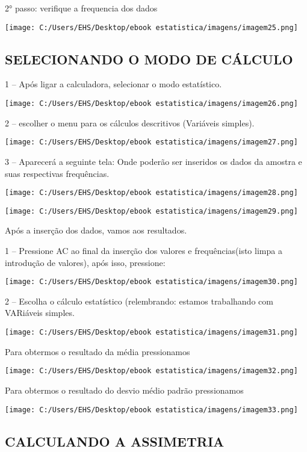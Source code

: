 \documentclass[]{book}
\begin{document}
2° passo: verifique a frequencia dos dados

\texttt{[image: C:/Users/EHS/Desktop/ebook estatistica/imagens/imagem25.png]}

\hypertarget{selecionando-o-modo-de-calculo}{%
\subsection{SELECIONANDO O MODO DE CÁLCULO}\label{selecionando-o-modo-de-calculo}}

1 -- Após ligar a calculadora, selecionar o modo estatístico.

\texttt{[image: C:/Users/EHS/Desktop/ebook estatistica/imagens/imagem26.png]}

2 -- escolher o menu para os cálculos descritivos (Variáveis simples).

\texttt{[image: C:/Users/EHS/Desktop/ebook estatistica/imagens/imagem27.png]}

3 -- Aparecerá a seguinte tela: Onde poderão ser inseridos os dados da amostra e suas respectivas frequências.

\texttt{[image: C:/Users/EHS/Desktop/ebook estatistica/imagens/imagem28.png]}

\texttt{[image: C:/Users/EHS/Desktop/ebook estatistica/imagens/imagem29.png]}

Após a inserção dos dados, vamos aos resultados.

1 -- Pressione AC ao final da inserção dos valores e frequências(isto limpa a introdução de valores), após isso, pressione:

\texttt{[image: C:/Users/EHS/Desktop/ebook estatistica/imagens/imagem30.png]}

2 -- Escolha o cálculo estatístico (relembrando: estamos trabalhando com VARiáveis simples.

\texttt{[image: C:/Users/EHS/Desktop/ebook estatistica/imagens/imagem31.png]}

Para obtermos o resultado da média pressionamos

\texttt{[image: C:/Users/EHS/Desktop/ebook estatistica/imagens/imagem32.png]}

Para obtermos o resultado do desvio médio padrão pressionamos

\texttt{[image: C:/Users/EHS/Desktop/ebook estatistica/imagens/imagem33.png]}

\hypertarget{calculando-a-assimetria-1}{%
\subsection{CALCULANDO A ASSIMETRIA}\label{calculando-a-assimetria-1}}
\end{document}
